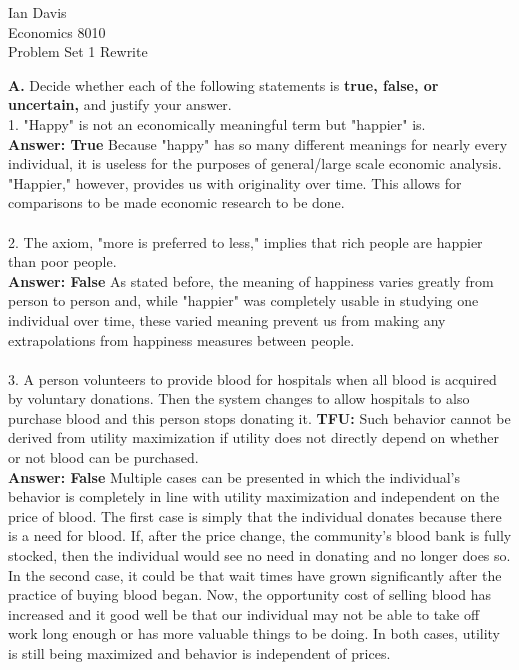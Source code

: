 \documentclass[11pt]{article}
\begin{document}
\begin{flushleft}
Ian Davis\\
Economics 8010\\
Problem Set 1 Rewrite\\
\end{flushleft}
\textbf{A.} Decide whether each of the following statements is \textbf{true, false, or uncertain,} and justify your answer.\\
1. "Happy" is not an economically meaningful term but "happier" is.
\\
\textbf{Answer: True} Because "happy" has so many different meanings for nearly every individual, it is useless for the purposes of general/large scale economic analysis. "Happier," however, provides us with originality over time. This allows for comparisons to be made economic research to be done.\\
\\
2. The axiom, "more is preferred to less," implies that rich people are happier than poor people.\\
\textbf{Answer: False} As stated before, the meaning of happiness varies greatly from person to person and, while "happier" was completely usable in studying one individual over time, these varied meaning prevent us from making any extrapolations from happiness measures between people. 
\\
\\
3. A person volunteers to provide blood for hospitals when all blood is acquired by voluntary donations. Then the system changes to allow hospitals to also purchase blood and this person stops donating it. \textbf{TFU:} Such behavior cannot be derived from utility maximization if utility does not directly depend on whether or not blood can be purchased.\\
\textbf{Answer: False} Multiple cases can be presented in which the individual's behavior is completely in line with utility maximization and independent on the price of blood. The first case is simply that the individual donates because there is a need for blood. If, after the price change, the community's blood bank is fully stocked, then the individual would see no need in donating and no longer does so. In the second case, it could be that wait times have grown significantly after the practice of buying blood began. Now, the opportunity cost of selling blood has increased and it good well be that our individual may not be able to take off work long enough or has more valuable things to be doing. In both cases, utility is still being maximized and behavior is independent of prices.\\
\end{document}
